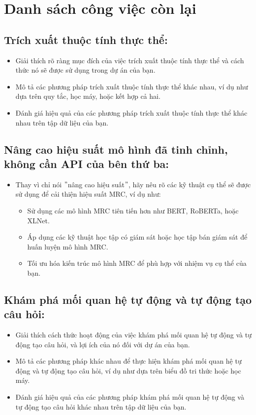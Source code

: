 \section{Danh sách công việc còn lại}\label{sec:danh-sach-cong-viec-con-lai}

\subsection{Trích xuất thuộc tính thực thể:}\label{subsec:2.-trien-khai-trich-xuat-thuoc-tinh-thuc-the:}
\begin{itemize}
    \item Giải thích rõ ràng mục đích của việc trích xuất thuộc tính thực thể và cách thức nó sẽ được sử dụng trong dự án của bạn.
    \item Mô tả các phương pháp trích xuất thuộc tính thực thể khác nhau, ví dụ như dựa trên quy tắc, học máy, hoặc kết hợp cả hai.
    \item Đánh giá hiệu quả của các phương pháp trích xuất thuộc tính thực thể khác nhau trên tập dữ liệu của bạn.
\end{itemize}


\subsection{Nâng cao hiệu suất mô hình đã tinh chỉnh, không cần API của bên thứ ba:}\label{subsec:3.-nang-cao-hieu-suat-mrc-(machine-reading-comprehension)-khong-can-api-cua-ben-thu-ba:}
\begin{itemize}
    \item Thay vì chỉ nói \("\)nâng cao hiệu suất\("\), hãy nêu rõ các kỹ thuật cụ thể sẽ được sử dụng để cải thiện hiệu suất MRC, ví dụ như:
    \begin{itemize}
        \item Sử dụng các mô hình MRC tiên tiến hơn như BERT, RoBERTa, hoặc XLNet.
        \item Áp dụng các kỹ thuật học tập có giám sát hoặc học tập bán giám sát để huấn luyện mô hình MRC.
        \item Tối ưu hóa kiến trúc mô hình MRC để phù hợp với nhiệm vụ cụ thể của bạn.
    \end{itemize}
\end{itemize}


\subsection{Khám phá mối quan hệ tự động và tự động tạo câu hỏi:}\label{subsec:4.-kham-pha-moi-quan-he-tu-ong-va-tu-ong-tao-cau-hoi:}
\begin{itemize}
    \item Giải thích cách thức hoạt động của việc khám phá mối quan hệ tự động và tự động tạo câu hỏi, và lợi ích của nó đối với dự án của bạn.
    \item Mô tả các phương pháp khác nhau để thực hiện khám phá mối quan hệ tự động và tự động tạo câu hỏi, ví dụ như dựa trên biểu đồ tri thức hoặc học máy.
    \item Đánh giá hiệu quả của các phương pháp khám phá mối quan hệ tự động và tự động tạo câu hỏi khác nhau trên tập dữ liệu của bạn.
\end{itemize}


